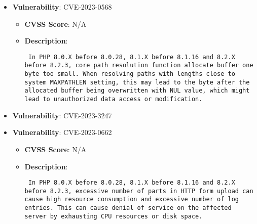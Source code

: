 \documentclass{article}
\begin{document}
\begin{itemize}
    
        \item \textbf{Vulnerability}: CVE-2023-0568
        \begin{itemize}
            \item \textbf{CVSS Score}:  N/A 
            \item \textbf{Description}: \parbox{\linewidth}{\texttt{ In PHP 8.0.X before 8.0.28, 8.1.X before 8.1.16 and 8.2.X before 8.2.3, core path resolution function allocate buffer one byte too small. When resolving paths with lengths close to system MAXPATHLEN setting, this may lead to the byte after the allocated buffer being overwritten with NUL value, which might lead to unauthorized data access or modification.  }}
        \end{itemize}
    
        \item \textbf{Vulnerability}: CVE-2023-3247
    
        \item \textbf{Vulnerability}: CVE-2023-0662
        \begin{itemize}
            \item \textbf{CVSS Score}:  N/A 
            \item \textbf{Description}: \parbox{\linewidth}{\texttt{ In PHP 8.0.X before 8.0.28, 8.1.X before 8.1.16 and 8.2.X before 8.2.3, excessive number of parts in HTTP form upload can cause high resource consumption and excessive number of log entries. This can cause denial of service on the affected server by exhausting CPU resources or disk space.  }}
        \end{itemize}
    

\end{itemize}
\end{document}
